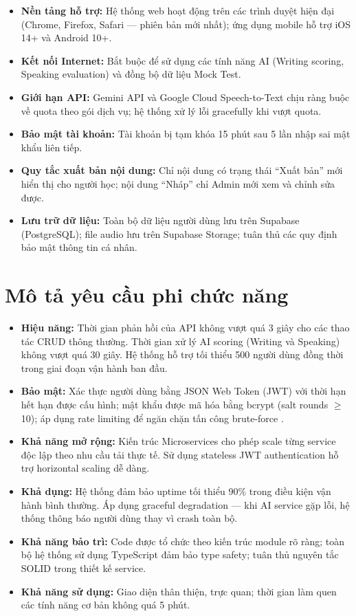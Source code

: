 \documentclass[a4paper,12pt]{extreport}
\begin{document}
\begin{itemize}
    \item \textbf{Nền tảng hỗ trợ:} Hệ thống web hoạt động trên các trình duyệt hiện đại (Chrome, Firefox, Safari — phiên bản mới nhất); ứng dụng mobile hỗ trợ iOS 14+ và Android 10+.
    \item \textbf{Kết nối Internet:} Bắt buộc để sử dụng các tính năng AI (Writing scoring, Speaking evaluation) và đồng bộ dữ liệu Mock Test.
    \item \textbf{Giới hạn API:} Gemini API và Google Cloud Speech-to-Text chịu ràng buộc về quota theo gói dịch vụ; hệ thống xử lý lỗi gracefully khi vượt quota.
    \item \textbf{Bảo mật tài khoản:} Tài khoản bị tạm khóa 15 phút sau 5 lần nhập sai mật khẩu liên tiếp.
    \item \textbf{Quy tắc xuất bản nội dung:} Chỉ nội dung có trạng thái ``Xuất bản'' mới hiển thị cho người học; nội dung ``Nháp'' chỉ Admin mới xem và chỉnh sửa được.
    \item \textbf{Lưu trữ dữ liệu:} Toàn bộ dữ liệu người dùng lưu trên Supabase (PostgreSQL); file audio lưu trên Supabase Storage; tuân thủ các quy định bảo mật thông tin cá nhân.
\end{itemize}

\section{Mô tả yêu cầu phi chức năng}

\begin{itemize}
    \item \textbf{Hiệu năng:} Thời gian phản hồi của API không vượt quá 3 giây cho các thao tác CRUD thông thường. Thời gian xử lý AI scoring (Writing và Speaking) không vượt quá 30 giây. Hệ thống hỗ trợ tối thiểu 500 người dùng đồng thời trong giai đoạn vận hành ban đầu.
    \item \textbf{Bảo mật:} Xác thực người dùng bằng JSON Web Token (JWT) với thời hạn hết hạn được cấu hình; mật khẩu được mã hóa bằng bcrypt (salt rounds $\geq$ 10); áp dụng rate limiting để ngăn chặn tấn công brute-force \cite{jwt-rfc}.
    \item \textbf{Khả năng mở rộng:} Kiến trúc Microservices cho phép scale từng service độc lập theo nhu cầu tải thực tế. Sử dụng stateless JWT authentication hỗ trợ horizontal scaling dễ dàng.
    \item \textbf{Khả dụng:} Hệ thống đảm bảo uptime tối thiểu 90\% trong điều kiện vận hành bình thường. Áp dụng graceful degradation — khi AI service gặp lỗi, hệ thống thông báo người dùng thay vì crash toàn bộ.
    \item \textbf{Khả năng bảo trì:} Code được tổ chức theo kiến trúc module rõ ràng; toàn bộ hệ thống sử dụng TypeScript đảm bảo type safety; tuân thủ nguyên tắc SOLID trong thiết kế service.
    \item \textbf{Khả năng sử dụng:} Giao diện thân thiện, trực quan; thời gian làm quen các tính năng cơ bản không quá 5 phút.
\end{itemize}
\end{document}

